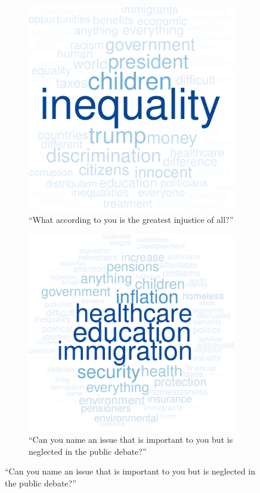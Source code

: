 \documentclass[12pt,english]{article}
\begin{document}
\begin{bibunit}
\begin{figure}[h!]
\begin{subfigure}{.48\textwidth}
  \end{subfigure}
  \begin{subfigure}{.48\textwidth}
    \caption[]{``What according to you is the greatest injustice of all?''}
    \includegraphics[height=.35\textheight]{../figures/all/injustice_field_en.pdf}
  \end{subfigure} \quad
  \begin{subfigure}{.48\textwidth}
    \caption[]{``Can you name an issue that is important to you but is neglected in the public debate?''}
    \includegraphics[height=.35\textheight]{../figures/all/issue_field_en.pdf}
  \end{subfigure} 
\end{figure}


\end{bibunit}
\end{document}
